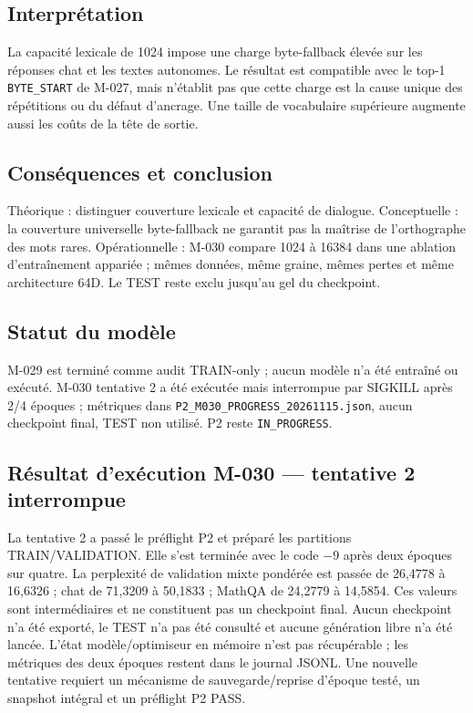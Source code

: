 \documentclass[11pt,a4paper]{report}
\begin{document}
\subsection{Interprétation}
La capacité lexicale de 1024 impose une charge byte-fallback élevée sur les réponses chat et les textes autonomes. Le résultat est compatible avec le top-1 \texttt{BYTE\_START} de M-027, mais n'établit pas que cette charge est la cause unique des répétitions ou du défaut d'ancrage. Une taille de vocabulaire supérieure augmente aussi les coûts de la tête de sortie.
\subsection{Conséquences et conclusion}
Théorique : distinguer couverture lexicale et capacité de dialogue. Conceptuelle : la couverture universelle byte-fallback ne garantit pas la maîtrise de l'orthographe des mots rares. Opérationnelle : M-030 compare 1024 à 16384 dans une ablation d'entraînement appariée ; mêmes données, même graine, mêmes pertes et même architecture 64D. Le TEST reste exclu jusqu'au gel du checkpoint.
\subsection{Statut du modèle}
M-029 est terminé comme audit TRAIN-only ; aucun modèle n'a été entraîné ou exécuté. M-030 tentative 2 a été exécutée mais interrompue par SIGKILL après 2/4 époques ; métriques dans \texttt{P2\_M030\_PROGRESS\_20261115.json}, aucun checkpoint final, TEST non utilisé. P2 reste \texttt{IN\_PROGRESS}.


\subsection{Résultat d'exécution M-030 — tentative 2 interrompue}
La tentative 2 a passé le préflight P2 et préparé les partitions TRAIN/VALIDATION. Elle s'est terminée avec le code $-9$ après deux époques sur quatre. La perplexité de validation mixte pondérée est passée de 26,4778 à 16,6326 ; chat de 71,3209 à 50,1833 ; MathQA de 24,2779 à 14,5854. Ces valeurs sont intermédiaires et ne constituent pas un checkpoint final. Aucun checkpoint n'a été exporté, le TEST n'a pas été consulté et aucune génération libre n'a été lancée. L'état modèle/optimiseur en mémoire n'est pas récupérable ; les métriques des deux époques restent dans le journal JSONL. Une nouvelle tentative requiert un mécanisme de sauvegarde/reprise d'époque testé, un snapshot intégral et un préflight P2 PASS.
\end{document}
